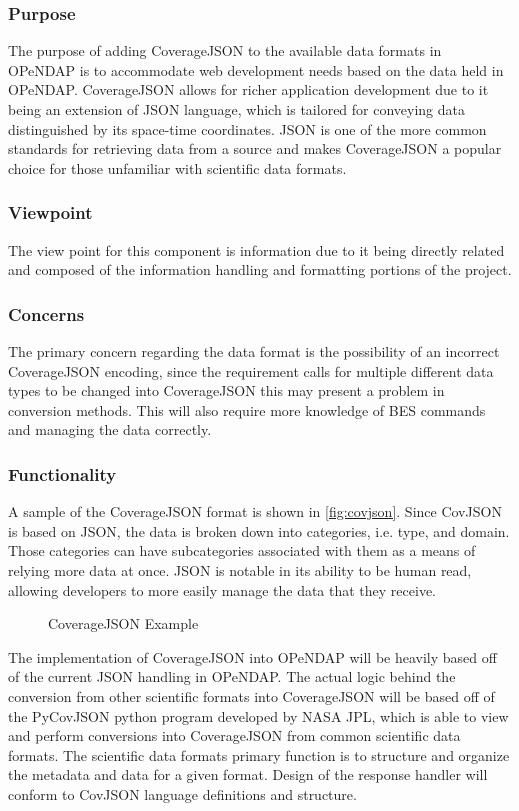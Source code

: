 \documentclass[onecolumn, draftclsnofoot,10pt, compsoc]{IEEEtran}
\begin{document}
\subsubsection{Purpose}
The purpose of adding CoverageJSON to the available data formats in OPeNDAP is to accommodate web development needs based on the data held in OPeNDAP. CoverageJSON allows for richer application development due to it being an extension of JSON language, which is tailored for conveying data distinguished by its space-time coordinates. JSON is one of the more common standards for retrieving data from a source and makes CoverageJSON a popular choice for those unfamiliar with scientific data formats.   

\subsubsection{Viewpoint}
The view point for this component is information due to it being directly related and composed of the information handling and formatting portions of the project. \cite{IEEE}

\subsubsection{Concerns}
The primary concern regarding the data format is the possibility of an incorrect CoverageJSON encoding, since the requirement calls for multiple different data types to be changed into CoverageJSON this may present a problem in conversion methods. This will also require more knowledge of BES commands and managing the data correctly. 

\subsubsection{Functionality}
A sample of the CoverageJSON format is shown in \autoref{fig:covjson}. Since CovJSON is based on JSON, the data is broken down into categories, i.e. type, and domain. Those categories can have subcategories associated with them as a means of relying more data at once. JSON is notable in its ability to be human read, allowing developers to more easily manage the data that they receive.
\begin{figure}[H]
    \centering
    
    \caption{CoverageJSON Example}
    \label{fig:covjson}
\end{figure}
The implementation of CoverageJSON into OPeNDAP will be heavily based off of the current JSON handling in OPeNDAP. The actual logic behind the conversion from other scientific formats into CoverageJSON will be based off of the PyCovJSON python program developed by NASA JPL, which is able to view and perform conversions into CoverageJSON from common scientific data formats. The scientific data formats primary function is to structure and organize the metadata and data for a given format. Design of the response handler will conform to CovJSON language definitions and structure. 
\end{document}
